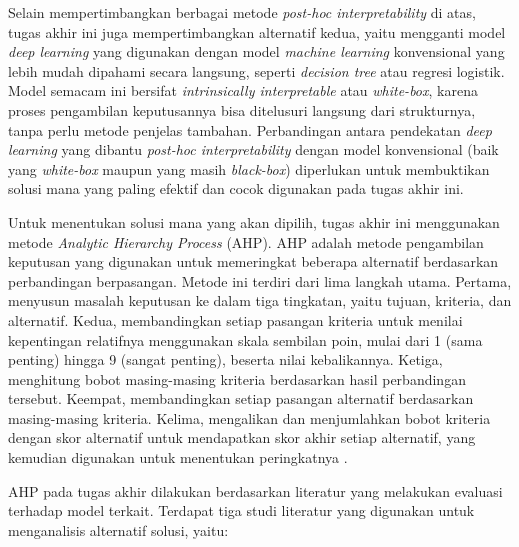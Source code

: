 Selain mempertimbangkan berbagai metode \textit{post-hoc interpretability} di atas, tugas akhir ini juga mempertimbangkan alternatif kedua, yaitu mengganti model \textit{deep learning} yang digunakan dengan model \textit{machine learning} konvensional yang lebih mudah dipahami secara langsung, seperti \textit{decision tree} atau regresi logistik. Model semacam ini bersifat \textit{intrinsically interpretable} atau \textit{white-box}, karena proses pengambilan keputusannya bisa ditelusuri langsung dari strukturnya, tanpa perlu metode penjelas tambahan. Perbandingan antara pendekatan \textit{deep learning} yang dibantu \textit{post-hoc interpretability} dengan model konvensional (baik yang \textit{white-box} maupun yang masih \textit{black-box}) diperlukan untuk membuktikan solusi mana yang paling efektif dan cocok digunakan pada tugas akhir ini.

Untuk menentukan solusi mana yang akan dipilih, tugas akhir ini menggunakan metode \textit{Analytic Hierarchy Process} (AHP). AHP adalah metode pengambilan keputusan yang digunakan untuk memeringkat beberapa alternatif berdasarkan perbandingan berpasangan. Metode ini terdiri dari lima langkah utama. Pertama, menyusun masalah keputusan ke dalam tiga tingkatan, yaitu tujuan, kriteria, dan alternatif. Kedua, membandingkan setiap pasangan kriteria untuk menilai kepentingan relatifnya menggunakan skala sembilan poin, mulai dari 1 (sama penting) hingga 9 (sangat penting), beserta nilai kebalikannya. Ketiga, menghitung bobot masing-masing kriteria berdasarkan hasil perbandingan tersebut. Keempat, membandingkan setiap pasangan alternatif berdasarkan masing-masing kriteria. Kelima, mengalikan dan menjumlahkan bobot kriteria dengan skor alternatif untuk mendapatkan skor akhir setiap alternatif, yang kemudian digunakan untuk menentukan peringkatnya \autocite{1000minds2025ahp}.

AHP pada tugas akhir dilakukan berdasarkan literatur yang melakukan evaluasi terhadap model terkait. Terdapat tiga studi literatur yang digunakan untuk menganalisis alternatif solusi, yaitu:

